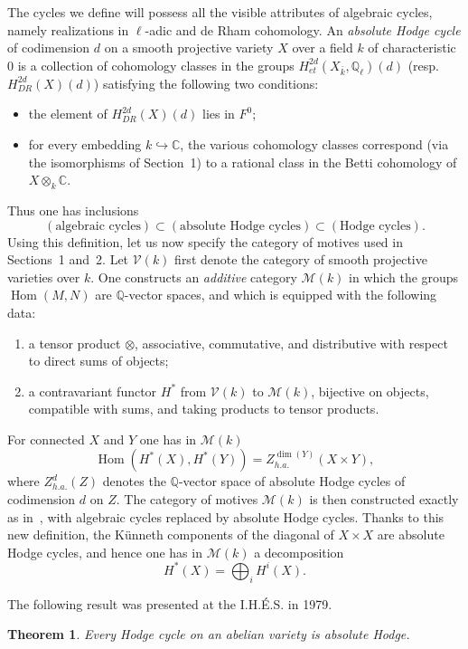 \documentclass[11pt]{amsart}
\newtheorem{theorem}{Theorem}
\theoremstyle{definition}
\DeclareMathOperator{\Hom}{Hom}
\newcommand{\QQ}{\mathbb{Q}}
\newcommand{\CC}{\mathbb{C}}
\begin{document}
The cycles we define will possess all the visible attributes of algebraic cycles, namely realizations in $\ell$-adic and de Rham cohomology. An \emph{absolute Hodge cycle} of codimension $d$ on a smooth projective variety $X$ over a field $k$ of characteristic $0$ is a collection of cohomology classes in the groups $H^{2d}_{et}(X_{\bar{k}},\QQ_\ell)(d)$ (resp. $H^{2d}_{DR}(X)(d)$) satisfying the following two conditions:
\begin{itemize}
\item the element of $H^{2d}_{DR}(X)(d)$ lies in $F^0$;
\item for every embedding $k\hookrightarrow\CC$, the various cohomology classes correspond (via the isomorphisms of Section~1) to a rational class in the Betti cohomology of $X\otimes_k \CC$.
\end{itemize}

Thus one has inclusions
\[
(\text{algebraic cycles}) \subset (\text{absolute Hodge cycles}) \subset (\text{Hodge cycles}).
\]
Using this definition, let us now specify the category of motives used in Sections~1 and~2. Let $\mathcal V(k)$ first denote the category of smooth projective varieties over $k$. One constructs an \emph{additive} category $\mathcal M(k)$ in which the groups $\Hom(M,N)$ are $\QQ$-vector spaces, and which is equipped with the following data:
\begin{enumerate}[label=\alph*)]
\item a tensor product $\otimes$, associative, commutative, and distributive with respect to direct sums of objects;
\item a contravariant functor $H^*$ from $\mathcal V(k)$ to $\mathcal M(k)$, bijective on objects, compatible with sums, and taking products to tensor products.
\end{enumerate}
For connected $X$ and $Y$ one has in $\mathcal M(k)$
\[
\Hom(H^*(X),H^*(Y)) = Z^{\dim(Y)}_{h.a.}(X\times Y),
\]
where $Z^d_{h.a.}(Z)$ denotes the $\QQ$-vector space of absolute Hodge cycles of codimension $d$ on $Z$. The category of motives $\mathcal M(k)$ is then constructed exactly as in~\cite{Demazure}, with algebraic cycles replaced by absolute Hodge cycles. Thanks to this new definition, the K\"unneth components of the diagonal of $X\times X$ are absolute Hodge cycles, and hence one has in $\mathcal M(k)$ a decomposition
\[
H^*(X)=\bigoplus_i H^i(X).
\]

The following result was presented at the I.H.\'E.S. in 1979.

\begin{theorem}
Every Hodge cycle on an abelian variety is absolute Hodge.
\end{theorem}
\end{document}
